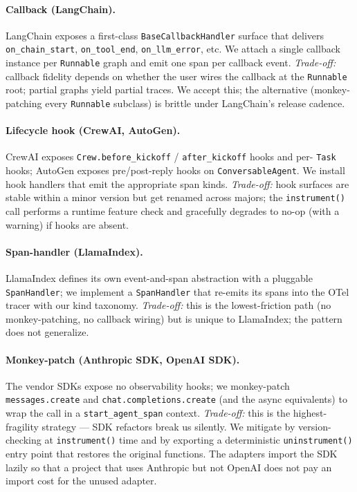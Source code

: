 \documentclass[sigplan,10pt,anonymous,review]{acmart}
\begin{document}
\paragraph{Callback (LangChain).} LangChain exposes a first-class
\texttt{BaseCallbackHandler} surface that delivers
\texttt{on\_chain\_start}, \texttt{on\_tool\_end},
\texttt{on\_llm\_error}, etc. We attach a single callback instance per
\texttt{Runnable} graph and emit one span per callback event. \emph{Trade-off:} callback
fidelity depends on whether the user wires the callback at the
\texttt{Runnable} root; partial graphs yield partial traces. We accept
this; the alternative (monkey-patching every \texttt{Runnable}
subclass) is brittle under LangChain's release cadence.

\paragraph{Lifecycle hook (CrewAI, AutoGen).} CrewAI exposes
\texttt{Crew.before\_kickoff} / \texttt{after\_kickoff} hooks and per-
\texttt{Task} hooks; AutoGen exposes pre/post-reply hooks on
\texttt{ConversableAgent}. We install hook handlers that emit the
appropriate span kinds. \emph{Trade-off:} hook surfaces are stable
within a minor version but get renamed across majors; the
\texttt{instrument()} call performs a runtime feature check and
gracefully degrades to no-op (with a warning) if hooks are absent.

\paragraph{Span-handler (LlamaIndex).} LlamaIndex defines its own
event-and-span abstraction with a pluggable \texttt{SpanHandler}; we
implement a \texttt{SpanHandler} that re-emits its spans into the OTel
tracer with our kind taxonomy. \emph{Trade-off:} this is the lowest-friction
path (no monkey-patching, no callback wiring) but is unique to
LlamaIndex; the pattern does not generalize.

\paragraph{Monkey-patch (Anthropic SDK, OpenAI SDK).} The vendor SDKs
expose no observability hooks; we monkey-patch
\texttt{messages.create} and \texttt{chat.completions.create} (and the
async equivalents) to wrap the call in a \texttt{start\_agent\_span}
context. \emph{Trade-off:} this is the highest-fragility strategy ---
SDK refactors break us silently. We mitigate by version-checking at
\texttt{instrument()} time and by exporting a deterministic
\texttt{uninstrument()} entry point that restores the original
functions. The adapters import the SDK lazily so that a project that
uses Anthropic but not OpenAI does not pay an import cost for the
unused adapter.
\end{document}

